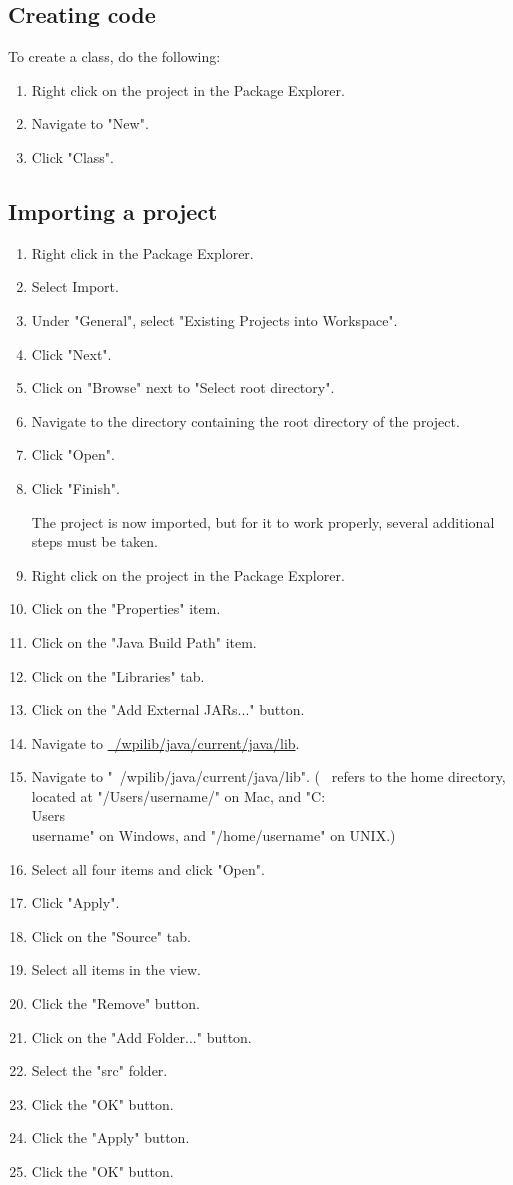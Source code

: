 \documentclass[]{report}
\begin{document}
\subsection{Creating code}
To create a class, do the following:

\begin{enumerate}
\item Right click on the project in the Package Explorer.
\item Navigate to "New".
\item Click "Class".
\end{enumerate}

\subsection{Importing a project}
\begin{enumerate}
\item Right click in the Package Explorer.
\item Select Import.
\item Under "General", select "Existing Projects into Workspace".
\item Click "Next".
\item Click on "Browse" next to "Select root directory".
\item Navigate to the directory containing the root directory of the project.
\item Click "Open".
\item Click "Finish".

The project is now imported, but for it to work properly, several additional steps must be taken.
\item Right click on the project in the Package Explorer.
\item Click on the "Properties" item.
\item Click on the "Java Build Path" item.
\item Click on the "Libraries" tab.
\item Click on the "Add External JARs..." button.
\item Navigate to \href{run:~/wpilib/java/current/java/lib}{~/wpilib/java/current/java/lib}.
\item Navigate to "~/wpilib/java/current/java/lib". (~ refers to the home directory, located at "/Users/username/" on Mac, and "C:\\Users\\username" on Windows, and "/home/username" on UNIX.)
\item Select all four items and click "Open".
\item Click "Apply".
\item Click on the "Source" tab.
\item Select all items in the view.
\item Click the "Remove" button.
\item Click on the "Add Folder..." button.
\item Select the "src" folder.
\item Click the "OK" button.
\item Click the "Apply" button.
\item Click the "OK" button.

\end{enumerate}
\end{document}
